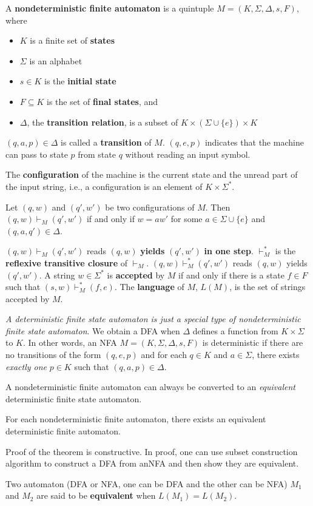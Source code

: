 \begin{multicols}{2}
\begin{definition}{}
  A \textbf{nondeterministic finite automaton} is a quintuple $M = (K, \Sigma, \Delta, s, F)$, where
  \begin{itemize}
    \item $K$ is a finite set of \textbf{states}
    \item $\Sigma$ is an alphabet
    \item $s \in K$ is the \textbf{initial state}
    \item $F \subseteq K$ is the set of \textbf{final states}, and
    \item $\Delta$, the \textbf{transition relation}, is a subset of $K \times (\Sigma \cup \{e\}) \times K$ 
\end{itemize}
\end{definition}

$(q, a, p) \in \Delta$ is called a \textbf{transition} of $M$. $(q, e, p)$ indicates that the machine can pass to state $p$ from state $q$ without reading an input symbol.

The \textbf{configuration} of the machine is the current state and the unread part of the input string, i.e., a configuration is an element of $K \times \Sigma^*$.

Let $(q, w)$ and $(q', w')$ be two configurations of $M$. Then $(q, w) \vdash_M (q', w')$ if and only if $w = aw'$ for some $a \in \Sigma \cup \{e\}$ and $(q, a, q') \in \Delta$.

$(q, w) \vdash_M (q', w')$ reads $(q, w)$ \textbf{yields} $(q', w')$ \textbf{in one step}. $\vdash^*_M$ is the \textbf{reflexive transitive closure} of $\vdash_M$. $(q, w) \vdash^*_M (q', w')$ reads $(q, w)$ yields $(q', w')$. A string $w \in \Sigma^*$ is \textbf{accepted} by $M$ if and only if there is a state $f \in F$ such that $(s, w) \vdash^*_M (f, e)$. The \textbf{language} of $M$, $L(M)$, is the set of strings accepted by $M$.

\textit{A deterministic finite state automaton is just a special type of nondeterministic finite state automaton}. We obtain a DFA when $\Delta$ defines a function from $K \times \Sigma$ to $K$. In other words, an NFA $M = (K, \Sigma, \Delta, s, F)$ is deterministic if there are no transitions of the form $(q, e, p)$ and for each $q \in K$ and $a \in \Sigma$, there exists \textit{exactly one} $p \in K$ such that $(q, a, p) \in \Delta$.

A nondeterministic finite automaton can always be converted to an \textit{equivalent} deterministic finite state automaton.

\begin{theorem}{}
  For each nondeterministic finite automaton, there exists an equivalent deterministic finite automaton.
\end{theorem}

Proof of the theorem is constructive. In proof, one can use subset construction algorithm to construct a DFA from anNFA and then show they are equivalent.

Two automaton (DFA or NFA, one can be DFA and the other can be NFA) $M_1$ and $M_2$ are said to be \textbf{equivalent} when $L(M_1) = L(M_2)$.

\end{multicols}

